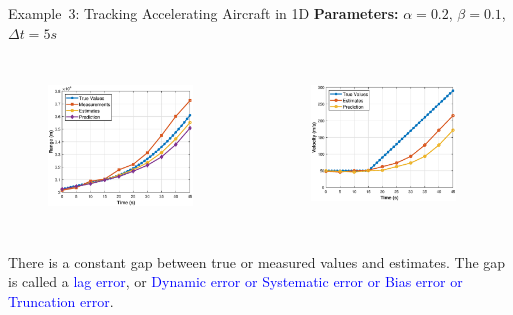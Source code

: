 \begin{frame}{Example~3: Tracking Accelerating Aircraft in 1D}
\textbf{Parameters:} $\alpha=0.2$, $\beta=0.1$, $\Delta t=5s$\\
\begin{columns}
    \begin{figure}
	    \centering
	    \includegraphics[width=0.9\textwidth]{Figures/Chapter1/ex3_estimationAlgorithm_range.eps}
	    \label{fig:ex3_estimationAlgorithm_range}
	\end{figure}
    
    \begin{figure}
	    \centering
	    \includegraphics[width=0.9\textwidth]{Figures/Chapter1/ex3_estimationAlgorithm_velocity.eps}
	    \label{fig:ex3_estimationAlgorithm_velocity}
	\end{figure}
\end{columns}
There is a constant gap between true or measured values and estimates. The gap is called a \textcolor{blue}{lag error}, or \textcolor{blue}{Dynamic error or Systematic error or Bias error or Truncation error}.
\vspace{5pt}


\end{frame}
